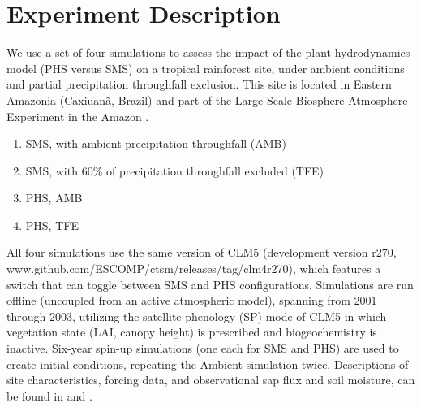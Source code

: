 \documentclass[draft,linenumbers]{agujournal}
\begin{document}
 
\section{Experiment Description}
\label{sect:exp}

We use a set of four simulations to assess the impact of the plant hydrodynamics model (PHS versus SMS) on a tropical rainforest site, under ambient conditions and partial precipitation throughfall exclusion.
This site is located in Eastern Amazonia (Caxiuan\~a, Brazil) and part of the Large-Scale Biosphere-Atmosphere Experiment in the Amazon \citep{avissar2002}.

\begin{enumerate}
\item SMS, with ambient precipitation throughfall (AMB)
\item SMS, with 60\% of precipitation throughfall excluded (TFE)
\item PHS, AMB
\item PHS, TFE
\end{enumerate}

All four simulations use the same version of CLM5
(development version r270, www.github.com/ESCOMP/ctsm/releases/tag/clm4\textunderscore r270),
which features a switch that can toggle between SMS and PHS configurations.
Simulations are run offline (uncoupled from an active atmospheric model), spanning from 2001 through 2003, utilizing the satellite phenology (SP) mode of CLM5 in which vegetation state (LAI, canopy height) is prescribed and biogeochemistry is inactive. Six-year spin-up simulations (one each for SMS and PHS) are used to create initial conditions, repeating the Ambient simulation twice. Descriptions of site characteristics, forcing data, and observational sap flux and soil moisture, can be found in \cite{fisher2007} and \cite{fisher2008}.
\end{document}
